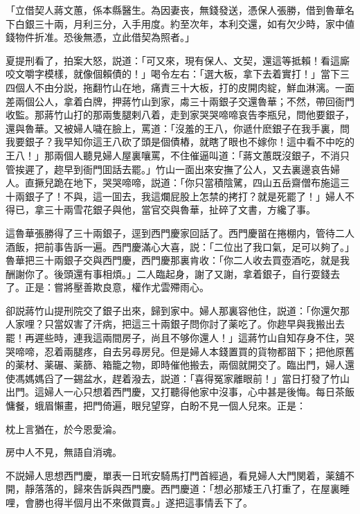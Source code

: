 \begin{myquote}[\markfont]
「立借契人蔣文蕙，係本縣醫生。為因妻丧，無錢發送，憑保人張勝，借到魯華名下白銀三十兩，月利三分，入手用度。約至次年，本利交還，如有欠少時，家中値錢物件折准。恐後無憑，立此借契為照者。」
\end{myquote}

夏提刑看了，拍案大怒，説道：「可又來，現有保人、文契，還這等抵賴！看這廝咬文嚼字模樣，就像個賴債的！」喝令左右：「選大板，拿下去着實打！」當下三四個人不由分説，拖翻竹山在地，痛責三十大板，打的皮開肉綻，鮮血淋漓。一面差兩個公人，拿着白牌，押蔣竹山到家，䖏三十兩銀子交還魯華；不然，帶回衙門收監。那蔣竹山打的那兩隻腿剌八着，走到家哭哭啼啼哀告李瓶兒，問他要銀子，還與魯華。又被婦人噦在臉上，罵道：「沒羞的王八，你遞什麽銀子在我手裏，問我要銀子？我早知你這王八砍了頭是個債樁，就瞎了眼也不嫁你！這中看不中吃的王八！」那兩個人聽見婦人屋裏嚷罵，不住催逼叫道：「蔣文蕙既沒銀子，不消只管挨遲了，趂早到衙門囬話去罷。」竹山一面出來安撫了公人，又去裏邊哀告婦人。直撅兒跪在地下，哭哭啼啼，説道：「你只當積陰騭，四山五岳齋僧布施這三十兩銀子了！不與，這一囬去，我這爛屁股上怎禁的拷打？就是死罷了！」婦人不得已，拿三十兩雪花銀子與他，當官交與魯華，扯碎了文書，方纔了事。

這魯華張勝得了三十兩銀子，逕到西門慶家回話了。西門慶㽞在捲棚内，管待二人酒飯，把前事告訴一遍。西門慶滿心大喜，説：「二位出了我口氣，足可以夠了。」魯華把三十兩銀子交與西門慶，西門慶那裏肯收：「你二人收去買壺酒吃，就是我酬謝你了。後頭還有事相煩。」二人臨起身，謝了又謝，拿着銀子，自行耍錢去了。正是：嘗將壓善欺良意，權作尤雲殢雨心。

卻説蔣竹山提刑院交了銀子出來，歸到家中。婦人那裏容他住，説道：「你還欠那人家哩？只當奴害了汗病，把這三十兩銀子問你討了薬吃了。你趂早與我搬出去罷！再遲些時，連我這兩間房子，尚且不够你還人！」這蔣竹山自知存身不住，哭哭啼啼，忍着兩腿疼，自去另尋房兒。但是婦人本錢置買的貨物都㽞下；把他原舊的薬材、薬碾、薬篩、箱籠之物，即時催他搬去，兩個就開交了。臨出門，婦人還使馮媽媽舀了一錫盆水，趕着潑去，説道：「喜得冤家離眼前！」當日打發了竹山出門。這婦人一心只想着西門慶，又打聽得他家中沒事，心中甚是後悔。每日茶飯慵餐，蛾眉懶畫，把門倚遍，眼兒望穿，白盼不見一個人兒來。正是：

\begin{myquote}
枕上言猶在，於今恩愛淪。

房中人不見，無語自消魂。
\end{myquote}

不説婦人思想西門慶，單表一日玳安騎馬打門首經過，看見婦人大門関着，薬舖不開，靜落落的，歸來告訴與西門慶。西門慶道：「想必那矮王八打重了，在屋裏睡哩，會勝也得半個月出不來做買賣。」遂把這事情丢下了。

